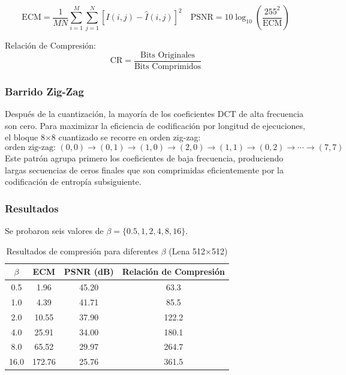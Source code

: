 \documentclass[12pt, a4paper]{article}
\begin{document}
\begin{equation}
\text{ECM} = \frac{1}{MN}\sum_{i=1}^{M}\sum_{j=1}^{N}[I(i,j)-\hat{I}(i,j)]^2
\quad
\text{PSNR} = 10\log_{10}\left(\frac{255^2}{\text{ECM}}\right)
\label{eq:metrics_es}
\end{equation}

Relaci\'on de Compresi\'on:
\begin{equation}
\text{CR} = \frac{\text{Bits Originales}}{\text{Bits Comprimidos}}
\label{eq:cr_es}
\end{equation}

\subsubsection{Barrido Zig-Zag}
Despu\'es de la cuantizaci\'on, la mayor\'ia de los coeficientes DCT de alta frecuencia son cero. Para maximizar la eficiencia de codificaci\'on por longitud de ejecuciones, el bloque 8$\times$8 cuantizado se recorre en orden zig-zag:
\begin{equation}
\text{orden zig-zag: } (0,0) \to (0,1) \to (1,0) \to (2,0) \to (1,1) \to (0,2) \to \cdots \to (7,7)
\end{equation}
Este patr\'on agrupa primero los coeficientes de baja frecuencia, produciendo largas secuencias de ceros finales que son comprimidas eficientemente por la codificaci\'on de entrop\'ia subsiguiente.

\subsubsection{Resultados}

Se probaron seis valores de $\beta = \{0.5, 1, 2, 4, 8, 16\}$.

\begin{table}[h]
\centering
\caption{Resultados de compresi\'on para diferentes $\beta$ (Lena 512$\times$512)}
\label{tab:p1_es}
\begin{tabular}{c|c|c|c}
\toprule
$\beta$ & ECM & PSNR (dB) & Relaci\'on de Compresi\'on \\
\midrule
0.5  & 1.96  & 45.20 & 63.3 \\
1.0  & 4.39  & 41.71 & 85.5 \\
2.0  & 10.55 & 37.90 & 122.2 \\
4.0  & 25.91 & 34.00 & 180.1 \\
8.0  & 65.52 & 29.97 & 264.7 \\
16.0 & 172.76 & 25.76 & 361.5 \\
\bottomrule
\end{tabular}
\end{table}
\end{document}
